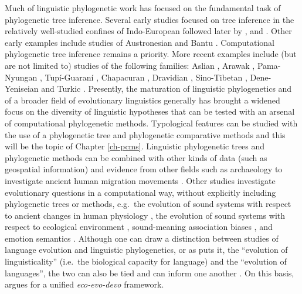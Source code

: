 Much of linguistic phylogenetic work has focused on the fundamental task of phylogenetic tree inference. Several early studies focused on tree inference in the relatively well-studied confines of Indo-European \autocites{gray_language-tree_2003}{atkinson_words_2005}{nicholls_dated_2008} followed later by \textcite{ryder_missing_2011}, \textcite{bouckaert_mapping_2012} and \textcite{chang_ancestry-constrained_2015}. Other early examples include studies of Austronesian \autocite{gray_language_2000} and Bantu \autocites{holden_bantu_2002}{holden_rapid_2006}. Computational phylogenetic tree inference remains a priority. More recent examples include (but are not limited to) studies of the following families: Aslian \autocite{dunn_aslian_2011}, Arawak \autocite{walker_bayesian_2011}, Pama-Nyungan \autocites{bowern_computational_2012}{bouckaert_origin_2018}, Tupí-Guaraní \autocite{michael_bayesian_2015}, Chapacuran \autocite{birchall_combined_2016}, Dravidian \autocite{kolipakam_bayesian_2018}, Sino-Tibetan \autocite{sagart_dated_2019}, Dene-Yeniseian \autocites{sicoli_linguistic_2014}[but c.f.][]{yanovich_phylogenetic_2020} and Turkic \autocite{savelyev_bayesian_2020}. Presently, the maturation of linguistic phylogenetics and of a broader field of evolutionary linguistics generally \autocites{dediu_language_2016}{nolle_language_2020} has brought a widened focus on the diversity of linguistic hypotheses that can be tested with an arsenal of computational phylogenetic methods. Typological features can be studied with the use of a phylogenetic tree and phylogenetic comparative methods \autocite[e.g.][]{dunn_evolved_2011} and this will be the topic of Chapter \ref{ch-pcms}. Linguistic phylogenetic trees and phylogenetic methods can be combined with other kinds of data (such as geospatial information) and evidence from other fields such as archaeology to investigate ancient human migration movements \autocites[e.g.][]{gray_language_2009}{bouckaert_mapping_2012}{bouckaert_origin_2018}. Other studies investigate evolutionary questions in a computational way, without explicitly including phylogenetic trees or methods, e.g.~the evolution of sound systems with respect to ancient changes in human physiology \autocite{blasi_human_2019}, the evolution of sound systems with respect to ecological environment \autocite{everett_climate_2015}, sound-meaning association biases \autocite{blasi_soundmeaning_2016}, and emotion semantics \autocite{jackson_emotion_2019}. Although one can draw a distinction between studies of language evolution and linguistic phylogenetics, or as \textcite{haspelmath_human_2020} puts it, the ``evolution of linguisticality'' (i.e.~the biological capacity for language) and the ``evolution of languages'', the two can also be tied and can inform one another \autocites{blasi_soundmeaning_2016}{nolle_language_2020}. On this basis, \textcite{segovia-martin_eco-evo-devo_2020} argues for a unified \emph{eco-evo-devo} framework.

